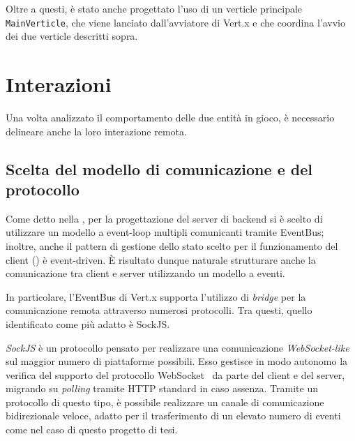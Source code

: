       Oltre a questi, è stato anche progettato l'uso di un verticle principale \texttt{MainVerticle}, che viene lanciato dall'avviatore di Vert.x e che coordina l'avvio dei due verticle descritti sopra.

    

  \section{Interazioni}\label{sec:arch:interaction}


    Una volta analizzato il comportamento delle due entità in gioco, è necessario delineare anche la loro interazione remota.

    \subsection{Scelta del modello di comunicazione e del protocollo}

      Come detto nella , per la progettazione del server di backend si è scelto di utilizzare un modello a event-loop multipli comunicanti tramite EventBus;
      inoltre, anche il pattern di gestione dello stato scelto per il funzionamento del client () è event-driven.
      È risultato dunque naturale strutturare anche la comunicazione tra client e server utilizzando un modello a eventi.

      In particolare, l'EventBus di Vert.x supporta l'utilizzo di \emph{bridge} per la comunicazione remota attraverso numerosi protocolli.
      Tra questi, quello identificato come più adatto è SockJS\@.

      \emph{SockJS} è un protocollo pensato per realizzare una comunicazione \emph{WebSocket-like} sul maggior numero di piattaforme possibili.
      Esso gestisce in modo autonomo la verifica del supporto del protocollo WebSocket~\cite{Melnikov2011} da parte del client e del server, migrando su \emph{polling} tramite HTTP standard in caso assenza.
      Tramite un protocollo di questo tipo, è possibile realizzare un canale di comunicazione bidirezionale veloce, adatto per il trasferimento di un elevato numero di eventi come nel caso di questo progetto di tesi.

